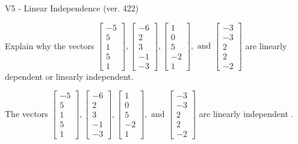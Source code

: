 \begin{exercise}
  \begin{exerciseTitle}V5 - Linear Independence (ver. 422)\end{exerciseTitle}
  \begin{exerciseStatement}
    Explain why the vectors \(\left[\begin{array}{r}
-5 \\
5 \\
1 \\
5 \\
1
\end{array}\right] , \left[\begin{array}{r}
-6 \\
2 \\
3 \\
-1 \\
-3
\end{array}\right] , \left[\begin{array}{r}
1 \\
0 \\
5 \\
-2 \\
1
\end{array}\right] , \text{ and } \left[\begin{array}{r}
-3 \\
-3 \\
2 \\
2 \\
-2
\end{array}\right]\) are linearly dependent or linearly independent.	


  \end{exerciseStatement}
  \begin{exerciseAnswer}
   The vectors \(\left[\begin{array}{r}
-5 \\
5 \\
1 \\
5 \\
1
\end{array}\right] , \left[\begin{array}{r}
-6 \\
2 \\
3 \\
-1 \\
-3
\end{array}\right] , \left[\begin{array}{r}
1 \\
0 \\
5 \\
-2 \\
1
\end{array}\right] , \text{ and } \left[\begin{array}{r}
-3 \\
-3 \\
2 \\
2 \\
-2
\end{array}\right]\) are 
  	 linearly independent  .
  


  \end{exerciseAnswer}
\end{exercise}